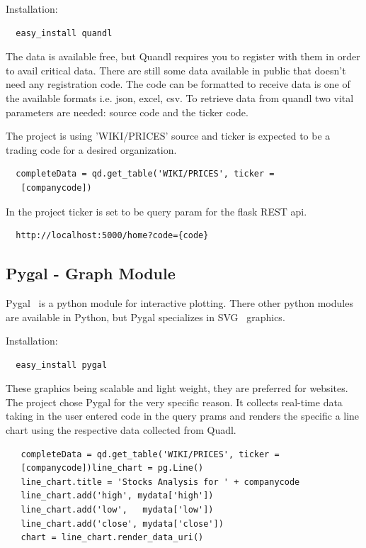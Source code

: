 Installation:

\begin{verbatim}
  easy_install quandl
\end{verbatim}
The data is available free, but Quandl requires you to register with them in
order to avail critical data. There are still some data available in public
that doesn’t need any registration code. The code can be formatted to receive
data is one of the available formats i.e. json, excel, csv. To retrieve data
from quandl two vital parameters are needed: source code and the ticker code.

The project is using 'WIKI/PRICES' source and ticker is expected to be a
trading code for a desired organization.
\begin{verbatim}
  completeData = qd.get_table('WIKI/PRICES', ticker =
   [companycode])
\end{verbatim}

In the project ticker is set to be query param for the flask REST api.
\begin{verbatim}
  http://localhost:5000/home?code={code}
\end{verbatim}
\subsection{Pygal - Graph Module}
Pygal~\cite{hid-sp18-417-Pygal} is a python module for interactive plotting.
There other python modules are available in Python, but Pygal specializes in
SVG~\cite{hid-sp18-417-SVG} graphics.

Installation:

\begin{verbatim}
  easy_install pygal
\end{verbatim}

These graphics being scalable and light weight, they are preferred for
websites. The project chose Pygal for the very specific reason. It collects
real-time data taking in the user entered code in the query prams and renders
the specific a line chart using the respective data collected from Quadl.
\begin{verbatim}
   completeData = qd.get_table('WIKI/PRICES', ticker =
   [companycode])line_chart = pg.Line()
   line_chart.title = 'Stocks Analysis for ' + companycode
   line_chart.add('high', mydata['high'])
   line_chart.add('low',   mydata['low'])
   line_chart.add('close', mydata['close'])
   chart = line_chart.render_data_uri()
\end{verbatim}

